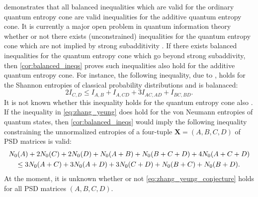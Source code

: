 \documentclass[notitlepage, 10pt]{article}
\begin{document}
\begin{rem}
     demonstrates that all balanced inequalities which are valid for the ordinary quantum entropy cone are valid inequalities for the additive quantum entropy cone.
    It is currently a major open problem in quantum information theory whether or not there exists (unconstrained) inequalities for the quantum entropy cone which are not implied by strong subadditivity \cite{linden2005new}.
    If there exists balanced inequalities for the quantum entropy cone which go beyond strong subaddivity, then \cref{cor:balanced_ineqs} proves such inequalities also hold for the additive quantum entropy cone.
    For instance, the following inequality, due to \citeauthor{zhang1998characterization} \cite{zhang1998characterization}, holds for the Shannon entropies of classical probability distributions and is balanaced:
    \begin{equation}
        \label{eq:zhang_yeung}
        2 I_{C, D} \leq I_{A, B} + I_{A, CD} + 3 I_{AC,AD} + I_{BC,BD}.
    \end{equation}
    It is not known whether this inequality holds for the quantum entropy cone also \cite{walter2014multipartite}.
    If the inequality in \cref{eq:zhang_yeung} does hold for the von Neumann entropies of quantum states, then \cref{cor:balanced_ineqs} would imply the following inequality constraining the unnormalized entropies of a four-tuple $\boldsymbol{X} = (A,B,C,D)$ of PSD matrices is valid:
    \begin{align}
        \label{eq:zhang_yeung_conjecture}
        \begin{split}
            &N_0(A) + 2 N_0(C) + 2 N_0(D) +N_{0}(A+B) +N_{0}(B+C+D) + 4N_{0}(A+C+D)\\
            &\quad\leq 
            3 N_0(A+C) + 3N_0(A+D) +3 N_{0}(C+D) + N_0(B+C) + N_0(B+D).
        \end{split}
    \end{align}
    At the moment, it is unknown whether or not \cref{eq:zhang_yeung_conjecture} holds for all PSD matrices $(A,B,C,D)$.


\end{rem}
\end{document}
